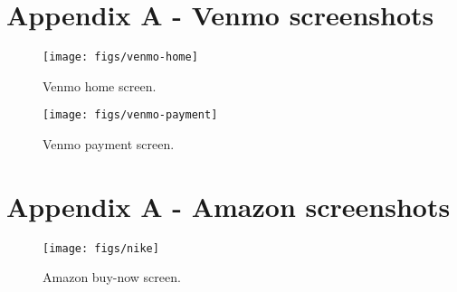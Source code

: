 \section{Appendix A - Venmo screenshots}

\begin{figure}[H]
  \centering
  \texttt{[image: figs/venmo-home]}
  \caption{Venmo home screen.}
  \label{fig::1}
\end{figure}

\begin{figure}[H]
  \centering
  \texttt{[image: figs/venmo-payment]}
  \caption{Venmo payment screen.}
  \label{fig::1}
\end{figure}


\section{Appendix A - Amazon screenshots}

\begin{figure}[H]
  \centering
  \texttt{[image: figs/nike]}
  \caption{Amazon buy-now screen.}
  \label{fig::1}
\end{figure}



